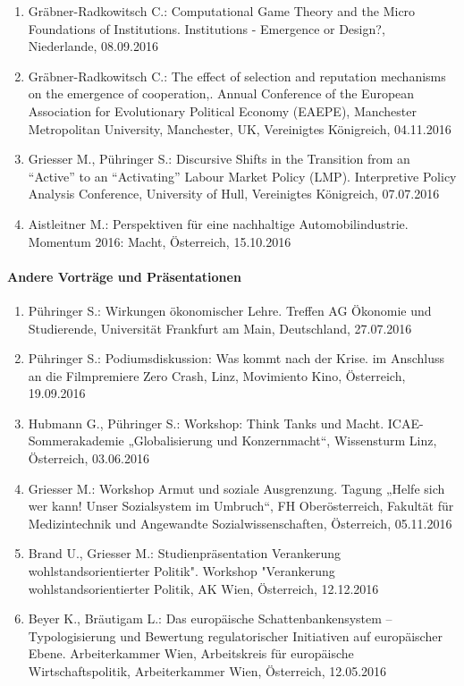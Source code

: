 \begin{enumerate}
	\item Gräbner-Radkowitsch C.: Computational Game Theory and the Micro Foundations of Institutions. Institutions - Emergence or Design?, Niederlande, 08.09.2016
	\item Gräbner-Radkowitsch C.: The effect of selection and reputation mechanisms on the emergence of cooperation,. Annual Conference of the European Association for Evolutionary Political Economy (EAEPE), Manchester Metropolitan University, Manchester, UK, Vereinigtes Königreich, 04.11.2016
	\item Griesser M., Pühringer S.: Discursive Shifts in the Transition from an “Active” to an “Activating” Labour Market Policy (LMP). Interpretive Policy Analysis Conference, University of Hull, Vereinigtes Königreich, 07.07.2016
	\item Aistleitner M.: Perspektiven für eine nachhaltige Automobilindustrie. Momentum 2016: Macht, Österreich, 15.10.2016
\end{enumerate}
\paragraph{Andere Vorträge und Präsentationen}
\begin{enumerate}
	\item Pühringer S.: Wirkungen ökonomischer Lehre. Treffen AG Ökonomie und Studierende, Universität Frankfurt am Main, Deutschland, 27.07.2016
	\item Pühringer S.: Podiumsdiskussion: Was kommt nach der Krise. im Anschluss an die Filmpremiere \glqq Zero Crash\grqq{}, Linz, Movimiento Kino, Österreich, 19.09.2016
	\item Hubmann G., Pühringer S.: Workshop: Think Tanks und Macht. ICAE-Sommerakademie „Globalisierung und Konzernmacht“, Wissensturm Linz, Österreich, 03.06.2016
	\item Griesser M.: Workshop \glqq Armut und soziale Ausgrenzung\grqq{}. Tagung „Helfe sich wer kann! Unser Sozialsystem im Umbruch“, FH Oberösterreich, Fakultät für Medizintechnik und Angewandte Sozialwissenschaften, Österreich, 05.11.2016
	\item Brand U., Griesser M.: Studienpräsentation \glqq Verankerung wohlstandsorientierter Politik". Workshop "Verankerung wohlstandsorientierter Politik\grqq{}, AK Wien, Österreich, 12.12.2016
	\item Beyer K., Bräutigam L.: Das europäische Schattenbankensystem – Typologisierung und Bewertung regulatorischer Initiativen auf europäischer Ebene. Arbeiterkammer Wien, Arbeitskreis für europäische Wirtschaftspolitik, Arbeiterkammer Wien, Österreich, 12.05.2016
\end{enumerate}
